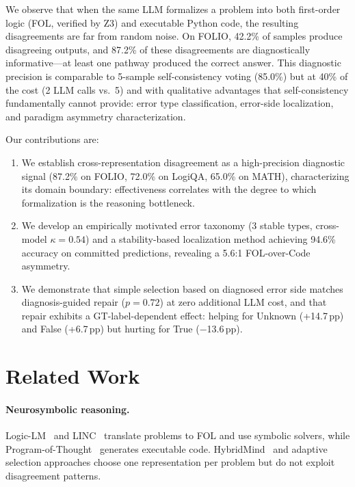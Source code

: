 \documentclass[11pt,a4paper]{article}
\newcommand{\pp}{\,pp}
\begin{document}
We observe that when the same LLM formalizes a problem into both first-order logic (FOL, verified by Z3) and executable Python code, the resulting disagreements are far from random noise.
On FOLIO, 42.2\% of samples produce disagreeing outputs, and 87.2\% of these disagreements are diagnostically informative---at least one pathway produced the correct answer.
This diagnostic precision is comparable to 5-sample self-consistency voting (85.0\%) but at 40\% of the cost (2 LLM calls vs.\ 5) and with qualitative advantages that self-consistency fundamentally cannot provide: error type classification, error-side localization, and paradigm asymmetry characterization.

Our contributions are:
\begin{enumerate}
\item We establish cross-representation disagreement as a high-precision diagnostic signal (87.2\% on FOLIO, 72.0\% on LogiQA, 65.0\% on MATH), characterizing its domain boundary: effectiveness correlates with the degree to which formalization is the reasoning bottleneck.
\item We develop an empirically motivated error taxonomy (3 stable types, cross-model $\kappa{=}0.54$) and a stability-based localization method achieving 94.6\% accuracy on committed predictions, revealing a 5.6:1 FOL-over-Code asymmetry.
\item We demonstrate that simple selection based on diagnosed error side matches diagnosis-guided repair ($p{=}0.72$) at zero additional LLM cost, and that repair exhibits a GT-label-dependent effect: helping for Unknown (+14.7\pp{}) and False (+6.7\pp{}) but hurting for True ($-$13.6\pp{}).
\end{enumerate}

\section{Related Work}

\paragraph{Neurosymbolic reasoning.}
Logic-LM~\cite{pan2023logic} and LINC~\cite{olausson2023linc} translate problems to FOL and use symbolic solvers, while Program-of-Thought~\cite{chen2023program} generates executable code.
HybridMind~\cite{hybrid2024} and adaptive selection approaches choose one representation per problem but do not exploit disagreement patterns.
\end{document}
